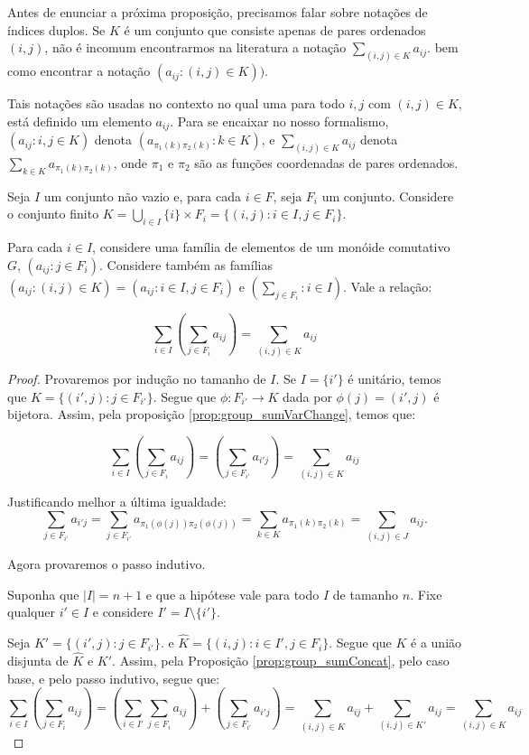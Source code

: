 Antes de enunciar a próxima proposição, precisamos falar sobre notações de índices duplos.
Se $K$ é um conjunto que consiste apenas de pares ordenados $(i, j)$, não é incomum encontrarmos na literatura a notação $\sum_{(i, j)\in K}a_{ij}$.
bem como encontrar a notação $(a_{ij}:(i, j)\in K))$.

Tais notações são usadas no contexto no qual uma para todo $i, j$ com $(i, j)\in K$, está definido um elemento $a_{ij}$.
Para se encaixar no nosso formalismo, $(a_{ij}:i, j \in K)$ denota $(a_{\pi_1(k)\pi_2(k)}: k \in K)$, e $\sum_{(i, j)\in K}a_{ij}$ denota $\sum_{k \in K}a_{\pi_1(k)\pi_2(k)}$, onde $\pi_1$ e $\pi_2$ são as funções coordenadas de pares ordenados.

\begin{prop}\label{prop:group_sumConcatII}
    Seja $I$ um conjunto não vazio e, para cada $i \in F$, seja $F_i$ um conjunto.
    Considere o conjunto finito $K=\bigcup_{i \in I}\{i\}\times F_i=\{(i, j): i \in I, j \in F_i\}$.

    Para cada $i \in I$, considere uma família de elementos de um monóide comutativo $G$, $(a_{ij}: j \in F_i)$.
    Considere também as famílias $(a_{ij}: (i, j)\in K)=(a_{ij}: i\in I, j \in F_i)$ e $(\sum_{j \in F_i}: i\in I)$. Vale a relação:

    \[\sum_{i \in I}\left(\sum_{j \in F_i}a_{ij}\right)=\sum_{(i, j)\in K}a_{ij}\]
\end{prop}
\begin{proof}
    Provaremos por indução no tamanho de $I$.
    Se $I=\{i'\}$ é unitário, temos que $K=\{(i', j): j \in F_{i'}\}$.
    Segue que $\phi:F_{i'}\rightarrow K$ dada por $\phi(j)=(i', j)$ é bijetora.
    Assim, pela proposição \ref{prop:group_sumVarChange}, temos que:

    \[\sum_{i \in I}\left(\sum_{j \in F_i}a_{ij}\right)=\left(\sum_{j \in F_{i'}}a_{i'j}\right)=\sum_{(i, j)\in K}a_{ij}\]

    Justificando melhor a última igualdade:
    \[\sum_{j \in F_{i'}}a_{i'j}=\sum_{j \in F_{i'}}a_{\pi_1(\phi(j))\pi_2(\phi(j))}=\sum_{k \in K}a_{\pi_1(k)\pi_2(k)}=\sum_{(i, j)\in J}a_{ij}.\]
    
    Agora provaremos o passo indutivo.

    Suponha que $|I|=n+1$ e que a hipótese vale para todo $I$ de tamanho $n$. Fixe qualquer $i' \in I$ e considere $I'=I\setminus \{i'\}$.

    Seja $K'=\{(i', j): j \in F_{i'}\}$. e $\hat K=\{(i, j): i \in I', j \in F_i\}$.
    Segue que $K$ é a união disjunta de $\hat K$ e $K'$.
    Assim, pela Proposição \ref{prop:group_sumConcat}, pelo caso base, e pelo passo indutivo, segue que:
    \[\sum_{i \in I}\left(\sum_{j \in F_i}a_{ij}\right)=\left(\sum_{i \in I'}\sum_{j \in F_{i}}a_{ij}\right)+\left(\sum_{j \in F_{i'}}a_{i'j}\right)=\sum_{(i, j)\in \hat K}a_{ij}+\sum_{(i, j)\in K'}a_{ij}=\sum_{(i, j)\in K}a_{ij}\]
\end{proof}

